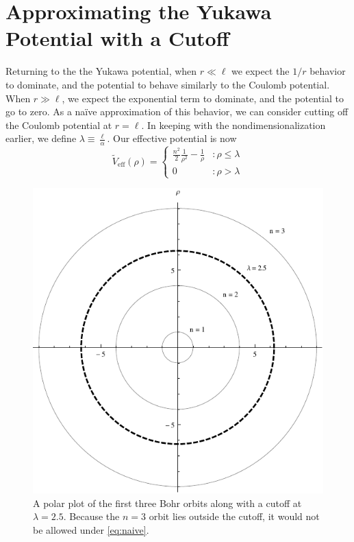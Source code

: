 \documentclass[12pt,twoside]{reedthesis}
\newcommand{\eqn}[1]{\begin{equation}#1\end{equation}}
\begin{document}
\section{Approximating the Yukawa Potential with a Cutoff}

Returning to the the Yukawa potential, when $r \ll \ell$ we expect the $1/r$ behavior to dominate, and the potential to behave similarly to the Coulomb potential. When $r \gg \ell$, we expect the exponential term to dominate, and the potential to go to zero. As a na\"ive approximation of this behavior, we can consider cutting off the Coulomb potential at $r = \ell$. In keeping with the nondimensionalization earlier, we define $\lambda \equiv \frac{\ell}{\alpha}$. Our effective potential is now
\eqn{
\tilde{V}_{\mathrm{eff}}(\rho) = \left\{
\begin{array}{lr}
 \frac{n^2}{2}\frac{1}{\rho^2}-\frac{1}{\rho} & : \rho \leq \lambda \\
0 & : \rho > \lambda
\end{array}
\right.
\label{eq:naive}
}

\begin{figure}[h]
\centering
	\includegraphics{Figures/cutoff}
	\caption[Yukawa orbits with cutoff]{A polar plot of the first three Bohr orbits along with a cutoff at $\lambda = 2.5$. Because the $n=3$ orbit lies outside the cutoff, it would not be allowed under \eqref{eq:naive}.}
	\label{fig:cutoff}
\end{figure}
\end{document}
